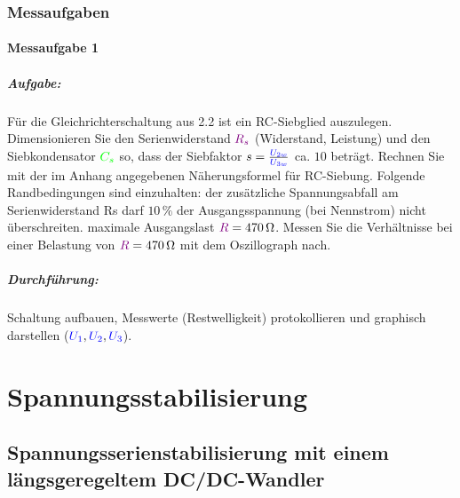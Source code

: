 \documentclass[11pt,a4paper,titlepage,parskip=half]{scrreprt}
\begin{document}
            \subsection{Messaufgaben}
            \subsubsection{Messaufgabe 1}
            \paragraph{Aufgabe:}  Für die Gleichrichterschaltung aus 2.2 ist ein RC-Siebglied auszulegen. Dimensionieren Sie den Serienwiderstand $\textcolor{violet}{R_s}$ (Widerstand, Leistung) und den Siebkondensator $\textcolor{green}{C_s}$ so, dass der Siebfaktor $s = \frac{\textcolor{blue}{U_{2w}}}{\textcolor{blue}{U_{3w}}}$ ca. $10$ beträgt. Rechnen Sie mit der im Anhang angegebenen Näherungsformel für RC-Siebung. Folgende Randbedingungen sind einzuhalten: der zusätzliche Spannungsabfall am Serienwiderstand Rs darf $10\,\%$ der Ausgangsspannung (bei Nennstrom) nicht überschreiten. maximale Ausgangslast $\textcolor{violet}{R} = \SI{470}{\ohm}$. Messen Sie die Verhältnisse bei einer Belastung von $\textcolor{violet}{R} = \SI{470}{\ohm}$ mit dem Oszillograph nach.
            \paragraph{Durchführung: } Schaltung aufbauen, Messwerte (Restwelligkeit) protokollieren und graphisch darstellen ($\textcolor{blue}{U_1}, \textcolor{blue}{U_2}, \textcolor{blue}{U_3} $).
            
        
    \chapter{Spannungsstabilisierung}
        \section{Spannungsserienstabilisierung mit einem längsgeregeltem DC/DC-Wandler}
\end{document}
